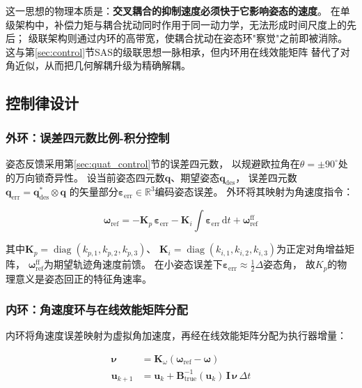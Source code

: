 这一思想的物理本质是：\textbf{交叉耦合的抑制速度必须快于它影响姿态的速度}。
在单级架构中，补偿力矩与耦合扰动同时作用于同一动力学，无法形成时间尺度上的先后；
级联架构则通过内环的高带宽，使耦合扰动在姿态环"察觉"之前即被消除。
这与第\ref{sec:control}节SAS的级联思想一脉相承，但内环用在线效能矩阵
替代了对角近似，从而把几何解耦升级为精确解耦。

\subsection{控制律设计}
\label{sec:cascade_design}

\subsubsection{外环：误差四元数比例-积分控制}

姿态反馈采用第\ref{sec:quat_control}节的误差四元数，
以规避欧拉角在$\theta=\pm90^\circ$处的万向锁奇异性。
设当前姿态四元数$\mathbf{q}$、期望姿态$\mathbf{q}_{\mathrm{des}}$，
误差四元数$\mathbf{q}_{\mathrm{err}}=\mathbf{q}_{\mathrm{des}}^{*}\otimes\mathbf{q}$
的矢量部分$\boldsymbol{\varepsilon}_{\mathrm{err}}\in\mathbb{R}^3$编码姿态误差。
外环将其映射为角速度指令：

\begin{equation}
    \boxed{
    \boldsymbol{\omega}_{\mathrm{ref}}
    = -\mathbf{K}_p\,\boldsymbol{\varepsilon}_{\mathrm{err}}
      - \mathbf{K}_i\int\boldsymbol{\varepsilon}_{\mathrm{err}}\,\mathrm{d}t
      + \boldsymbol{\omega}_{\mathrm{ref}}^{\mathrm{ff}}
    }
    \label{eq:cascade_outer_ch}
\end{equation}

其中$\mathbf{K}_p=\operatorname{diag}(k_{p,1},k_{p,2},k_{p,3})$、
$\mathbf{K}_i=\operatorname{diag}(k_{i,1},k_{i,2},k_{i,3})$为正定对角增益矩阵，
$\boldsymbol{\omega}_{\mathrm{ref}}^{\mathrm{ff}}$为期望轨迹角速度前馈。
在小姿态误差下$\boldsymbol{\varepsilon}_{\mathrm{err}}\approx\frac{1}{2}\Delta$姿态角，
故$K_p$的物理意义是姿态回正的特征角速率。

\subsubsection{内环：角速度环与在线效能矩阵分配}

内环将角速度误差映射为虚拟角加速度，再经在线效能矩阵分配为执行器增量：

\begin{align}
    \boldsymbol{\nu} &= \mathbf{K}_\omega\left(\boldsymbol{\omega}_{\mathrm{ref}}
                        - \boldsymbol{\omega}\right)
    \label{eq:cascade_nu_ch}\\
    \mathbf{u}_{k+1} &= \mathbf{u}_k
        + \mathbf{B}_{\mathrm{true}}^{-1}(\mathbf{u}_k)\,
          \mathbf{I}\,\boldsymbol{\nu}\,\Delta t
    \label{eq:cascade_alloc_ch}
\end{align}

